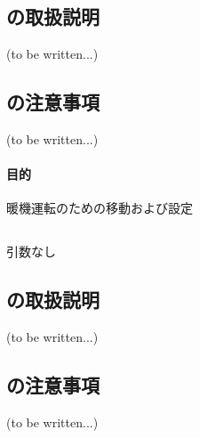 \subsection{\DLone の取扱説明\TBW}
(to be written...)


\subsection{\DLone の注意事項\TBW}
(to be written...)



\clearpage

\paragraph*{目的}
暖機運転のための移動および設定


\subsection{\OwarmingupAArguments}
引数なし


\subsection{\OwarmingupA の取扱説明\TBW}
(to be written...)


\subsection{\OwarmingupA の注意事項\TBW}
(to be written...)



